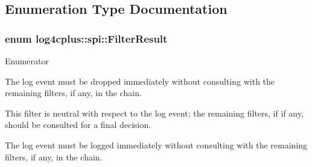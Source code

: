 \subsection{Enumeration Type Documentation}
\hypertarget{namespacelog4cplus_1_1spi_aa910f475d36c00f943ef78e37d11e3f6}{
\subsubsection[{Filter\-Result}]{\setlength{\rightskip}{0pt plus 5cm}enum {\bf log4cplus\-::spi\-::\-Filter\-Result}}}\label{namespacelog4cplus_1_1spi_aa910f475d36c00f943ef78e37d11e3f6}
\begin{Desc}
\item[Enumerator]\par
\begin{description}
\item[{\em 
\hypertarget{namespacelog4cplus_1_1spi_aa910f475d36c00f943ef78e37d11e3f6a4782fd85324c15b37a4de87628f51634}{D\-E\-N\-Y}\label{namespacelog4cplus_1_1spi_aa910f475d36c00f943ef78e37d11e3f6a4782fd85324c15b37a4de87628f51634}
}]The log event must be dropped immediately without consulting with the remaining filters, if any, in the chain. \item[{\em 
\hypertarget{namespacelog4cplus_1_1spi_aa910f475d36c00f943ef78e37d11e3f6ae75ab2e37a542c14fe57be606502a550}{N\-E\-U\-T\-R\-A\-L}\label{namespacelog4cplus_1_1spi_aa910f475d36c00f943ef78e37d11e3f6ae75ab2e37a542c14fe57be606502a550}
}]This filter is neutral with respect to the log event; the remaining filters, if if any, should be consulted for a final decision. \item[{\em 
\hypertarget{namespacelog4cplus_1_1spi_aa910f475d36c00f943ef78e37d11e3f6a222b6ce4c30f1d7d9164b901bb2907a7}{A\-C\-C\-E\-P\-T}\label{namespacelog4cplus_1_1spi_aa910f475d36c00f943ef78e37d11e3f6a222b6ce4c30f1d7d9164b901bb2907a7}
}]The log event must be logged immediately without consulting with the remaining filters, if any, in the chain. \end{description}
\end{Desc}


